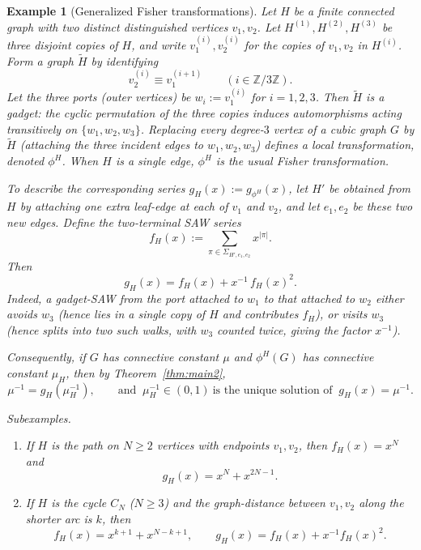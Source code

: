 \documentclass[12pt]{amsart}
\theoremstyle{plain}
\newtheorem{example}[theorem]{Example}
\numberwithin{equation}{section}
\numberwithin{theorem}{section}
\numberwithin{figure}{section}
\begin{document}
\begin{example}[Generalized Fisher transformations]\label{ex:GFT}
Let $H$ be a finite connected graph with two distinct distinguished vertices $v_1,v_2$.
Let $H^{(1)},H^{(2)},H^{(3)}$ be three disjoint copies of $H$, and write
$v_{1}^{(i)},v_{2}^{(i)}$ for the copies of $v_1,v_2$ in $H^{(i)}$.
Form a graph $\widetilde H$ by identifying
\[
v_{2}^{(i)} \equiv v_{1}^{(i+1)} \qquad (i \in \mathbb Z/3\mathbb Z).
\]
Let the three ports (outer vertices) be $w_i:=v_{1}^{(i)}$ for $i=1,2,3$.
Then $\widetilde H$ is a gadget: the cyclic permutation of the three copies induces
automorphisms acting transitively on $\{w_1,w_2,w_3\}$.
Replacing every degree-$3$ vertex of a cubic graph $G$ by $\widetilde H$ (attaching the three
incident edges to $w_1,w_2,w_3$) defines a local transformation, denoted $\phi^H$.
When $H$ is a single edge, $\phi^H$ is the usual Fisher transformation.

To describe the corresponding series $g_H(x):=g_{\phi^H}(x)$, let $H'$ be obtained from $H$
by attaching one extra leaf-edge at each of $v_1$ and $v_2$, and let $e_1,e_2$ be these two new edges.
Define the two-terminal SAW series
\[
f_H(x):=\sum_{\pi\in\Sigma_{H',e_1,e_2}} x^{|\pi|}.
\]
Then
\begin{equation}\label{eq:gH}
g_H(x)=f_H(x)+x^{-1}\,f_H(x)^2.
\end{equation}
Indeed, a gadget-SAW from the port attached to $w_1$ to that attached to $w_2$
either avoids $w_3$ (hence lies in a single copy of $H$ and contributes $f_H$),
or visits $w_3$ (hence splits into two such walks, with $w_3$ counted twice, giving the factor $x^{-1}$).

Consequently, if $G$ has connective constant $\mu$ and $\phi^H(G)$ has connective constant $\mu_H$,
then by Theorem~\ref{thm:main2},
\[
\mu^{-1}=g_H(\mu_H^{-1}),
\qquad\text{and }\ \mu_H^{-1}\in(0,1)\ \text{is the unique solution of }\ g_H(x)=\mu^{-1}.
\]

\smallskip
\noindent\emph{Subexamples.}
\begin{enumerate}
\item If $H$ is the path on $N\ge2$ vertices with endpoints $v_1,v_2$, then $f_H(x)=x^N$ and
\[
g_H(x)=x^N+x^{2N-1}.
\]
\item If $H$ is the cycle $C_N$ ($N\ge3$) and the graph-distance between $v_1,v_2$ along the shorter arc is $k$,
then
\[
f_H(x)=x^{k+1}+x^{N-k+1},
\qquad
g_H(x)=f_H(x)+x^{-1}f_H(x)^2.
\]
\end{enumerate}
\end{example}
\end{document}
